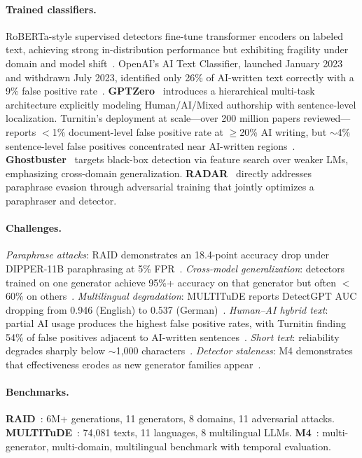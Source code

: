 \paragraph{Trained classifiers.}
RoBERTa-style supervised detectors fine-tune transformer encoders on labeled text, achieving strong in-distribution performance but exhibiting fragility under domain and model shift~\cite{dugan2024raid}. OpenAI's AI Text Classifier, launched January 2023 and withdrawn July 2023, identified only 26\% of AI-written text correctly with a 9\% false positive rate~\cite{openai2023classifier}. \textbf{GPTZero}~\cite{adam2026gptzero} introduces a hierarchical multi-task architecture explicitly modeling Human/AI/Mixed authorship with sentence-level localization. Turnitin's deployment at scale---over 200 million papers reviewed---reports $<$1\% document-level false positive rate at $\geq$20\% AI writing, but $\sim$4\% sentence-level false positives concentrated near AI-written regions~\cite{turnitin2024}. \textbf{Ghostbuster}~\cite{verma2024ghostbuster} targets black-box detection via feature search over weaker LMs, emphasizing cross-domain generalization. \textbf{RADAR}~\cite{hu2023radar} directly addresses paraphrase evasion through adversarial training that jointly optimizes a paraphraser and detector.

\paragraph{Challenges.}
\emph{Paraphrase attacks}: RAID demonstrates an 18.4-point accuracy drop under DIPPER-11B paraphrasing at 5\% FPR~\cite{dugan2024raid}. \emph{Cross-model generalization}: detectors trained on one generator achieve 95\%+ accuracy on that generator but often $<$60\% on others~\cite{dugan2024raid}. \emph{Multilingual degradation}: MULTITuDE reports DetectGPT AUC dropping from 0.946 (English) to 0.537 (German)~\cite{macko2023multitude}. \emph{Human--AI hybrid text}: partial AI usage produces the highest false positive rates, with Turnitin finding 54\% of false positives adjacent to AI-written sentences~\cite{turnitin2024}. \emph{Short text}: reliability degrades sharply below $\sim$1,000 characters~\cite{openai2023classifier}. \emph{Detector staleness}: M4 demonstrates that effectiveness erodes as new generator families appear~\cite{wang2024m4}.

\paragraph{Benchmarks.}
\textbf{RAID}~\cite{dugan2024raid}: 6M+ generations, 11 generators, 8 domains, 11 adversarial attacks. \textbf{MULTITuDE}~\cite{macko2023multitude}: 74,081 texts, 11 languages, 8 multilingual LLMs. \textbf{M4}~\cite{wang2024m4}: multi-generator, multi-domain, multilingual benchmark with temporal evaluation.


